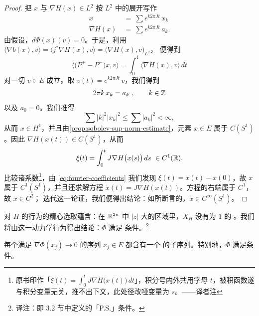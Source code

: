 \begin{proof}
把 $x$ 与 $\nabla H(x)\in L^{2}$ 按 $L^{2}$ 中的\trFourier{}展开写作
\begin{align*}
x\ &=\ \sum e^{k2\pi Jt}\,x_{k}\\
\nabla H(x)\ &=\ \sum e^{k2\pi Jt}\,a_{k}.
\end{align*}
由假设，$d\Phi(x)(v)=0$。于是，利用 $\langle\nabla b(x),v\rangle=%
\bigl\langle j^{*}\nabla H(x),v\bigr\rangle=\bigl(\nabla H(x),v\bigr)_{L^{2}}$，%
便得到
\[
\bigl\langle\bigl(P^{+}-P^{-}\bigr)x,v\bigr\rangle=\int_{0}^{1}%
\bigl\langle\nabla H(x),v\bigr\rangle\,dt
\]
对一切 $v\in E$ 成立。取\trTestFunction{} $v(t)=e^{k2\pi Jt}\,v$，我们得到
\begin{equation}\label{eq:fourier-coefficients}
2\pi k\,x_{k}=a_{k}\ ,\qquad k\in\mathbb{Z}
\end{equation}
以及 $a_{0}=0$。我们推得
\[
\sum|k|^{2}|x_{k}|^{2}\leq\sum|a_{k}|^{2}<\infty,
\]
从而 $x\in H^{1}$，并且由\cref{prop:sobolev-sup-norm-estimate}，元素%
$x\in E$ 属于 $C(S^{1})$。因此 $\nabla H(x(t))\in C(S^{1})$，从而
\[
\xi(t)=\int_{0}^{t}J\nabla H\bigl(x(s)\bigr)\,ds\ \in C^{1}(\mathbb{R}).
\]
比较诸\trFourier{}系数\footnote{原书印作「$\xi(t)=\int_{0}^{t}J\nabla H\bigl(x(t)\bigr)\,dt$」，积分号内外共用字母 $t$，被积函数遂与积分变量无关，推不出下文，此处径改哑变量为 $s$。——译者注}，由 \eqref{eq:fourier-coefficients} 我们发现%
$\xi(t)=x(t)-x(0)$，故 $x$ 属于 $C^{1}(S^{1})$，并且还求解方程%
$\dot{x}(t)=J\nabla H(x(t))$。方程的右端属于 $C^{1}$，故 $x\in C^{2}$；%
迭代这一论证，我们便得出结论：如所断言的，$x\in C^{\infty}(S^{1})$。
\end{proof}

对\trHamiltonianFunction{} $H$ 的\trAsymptotic{}行为的精心选取蕴含：在%
$\mathbb{R}^{2n}$ 中 $|z|$ 大的区域里，$X_H$ 没有\trPeriodic{}为 $1$ 的%
\trPeriodicSolution。我们将由这一动力学行为得出结论：$\Phi$ 满足%
\trPalaisSmale{}条件。\footnote{译注：即 3.2 节中定义的「P.S.」条件。}

\begin{lemma}\label{lem:palais-smale-condition}
每个满足 $\nabla\Phi(x_{j})\to0$ 的序列 $x_{j}\in E$ 都含有一个%
\trConverge{}的子序列。特别地，$\Phi$ 满足\trPalaisSmale{}条件。
\end{lemma}


